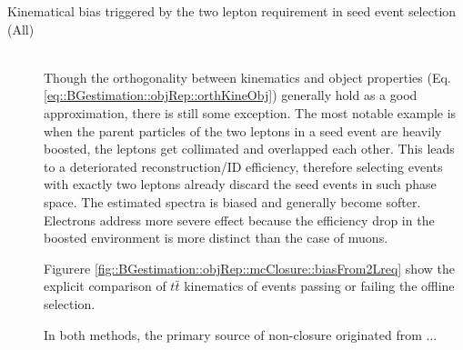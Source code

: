 \begin{description}
\item [Kinematical bias triggered by the two lepton requirement in seed event selection (All)] \mbox{} \\
Though the orthogonality between kinematics and object properties (Eq. \ref{eq::BGestimation::objRep::orthKineObj}) generally hold as a good approximation, there is still some exception. The most notable example is when the parent particles of the two leptons in a seed event are heavily boosted, the leptons get collimated and overlapped each other. This leads to a deteriorated reconstruction/ID efficiency, therefore selecting events with exactly two leptons already discard the seed events in such phase space. 
The estimated spectra is biased and generally become softer. Electrons address more severe effect because the efficiency drop in the boosted environment is more distinct than the case of muons.

Figurere \ref{fig::BGestimation::objRep::mcClosure::biasFrom2Lreq} show the explicit comparison of $t\bar{t}$ kinematics of events passing or failing the offline selection.

In both methods, the primary source of non-closure originated from ...
\begin{figure}[h]
  \centering


\end{figure}
\end{description}
